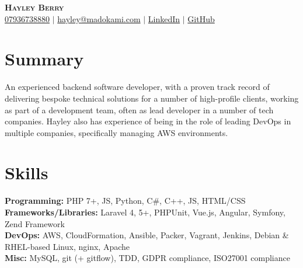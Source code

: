 \documentclass[letterpaper,11pt]{article}
\newcommand{\resumeSubHeadingListStart}{\begin{itemize}[leftmargin=0.15in, label={}]}
\newcommand{\resumeSubHeadingListEnd}{\end{itemize}}
\begin{document}

\begin{center}
    \textbf{\Huge \scshape Hayley Berry} \\ \vspace{3pt}
    \small
    \faMobile \hspace{.5pt} \href{tel:07936738880}{07936738880}
    $|$
    \faEnvelope \hspace{.5pt} \href{mailto:hayley@madokami.com}{hayley@madokami.com}
    $|$
    \faLinkedinSquare \hspace{.5pt} \href{https://www.linkedin.com/in/hayley-berry-xyz/}{LinkedIn}
    $|$
    \faGithub \hspace{.5pt} \href{https://github.com/hayleyxyz}{GitHub}
\end{center}



\section{Summary}
  \vspace{3pt}
  \resumeSubHeadingListStart
    \small{\item{
        An experienced backend software developer, with a proven track record of delivering bespoke technical solutions for a number
        of high-profile clients, working as part of a development team, often as lead developer in a number of tech companies.
        Hayley also has experience of being in the role of leading DevOps in multiple companies, specifically managing AWS environments.
    }}
  \resumeSubHeadingListEnd


\section{Skills}
  \vspace{2pt}
  \resumeSubHeadingListStart
    \small{\item{
        \textbf{Programming:}{ PHP 7+, JS, Python, C\#, C++, JS, HTML/CSS } \\ \vspace{3pt}
        \textbf{Frameworks/Libraries:}{ Laravel 4, 5+, PHPUnit, Vue.js, Angular, Symfony, Zend Framework } \\ \vspace{3pt}
        \textbf{DevOps:}{ AWS, CloudFormation, Ansible, Packer, Vagrant, Jenkins, Debian \& RHEL-based Linux, nginx, Apache } \\ \vspace{3pt}
        \textbf{Misc:}{ MySQL, git (+ gitflow), TDD, GDPR compliance, ISO27001 compliance } \\ \vspace{3pt}
    }}
  \resumeSubHeadingListEnd
\end{document}

